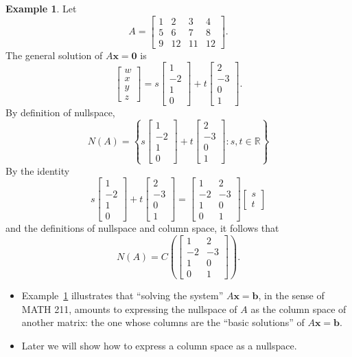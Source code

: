 \documentclass[12pt]{amsart}
\newcommand{\RR}{\mathbb{R}}
\theoremstyle{definition} \newtheorem{definition}[theorem]{Definition}
\newtheorem{example}[theorem]{Example}
\newcommand{\bb}{\mathbf{b}}
\newcommand{\bx}{\mathbf{x}}
\newcommand{\bzero}{\mathbf{0}}
\newcommand{\mat}[1]{\begin{bmatrix}#1\end{bmatrix}}
\begin{document}
\begin{example}\label{eg:null_to_column}
  Let
  \[
    A = \mat{1&2&3&4\\5&6&7&8\\9&12&11&12}.
  \]
  The general solution of $A\bx=\bzero$ is
  \[
    \mat{w\\x\\y\\z} = s\mat{1\\-2\\1\\0} + t\mat{2\\-3\\0\\1}.
  \]
  By definition of nullspace,
  \[
    N(A) = \left\{s\mat{1\\-2\\1\\0} + t\mat{2\\-3\\0\\1} : s,t\in\RR\right\}
  \]
  By the identity
  \[
    s\mat{1\\-2\\1\\0} + t\mat{2\\-3\\0\\1} =
    \mat{1&2\\-2&-3\\1&0\\0&1}\mat{s\\t}
  \]
  and the definitions of nullspace and column space, it follows that
  \[
    N(A) = C\left(\mat{1&2\\-2&-3\\1&0\\0&1}\right).
  \]
\end{example}

\begin{remarks}\hfill
  \begin{itemize}
    \item Example~\ref{eg:null_to_column} illustrates that ``solving the system'' $A\bx=\bb$, in the sense of MATH 211, amounts to expressing the nullspace of $A$ as the column space of another matrix: the one whose columns are the ``basic solutions'' of $A\bx=\bb$.
    \item Later we will show how to express a column space as a nullspace.
  \end{itemize}
\end{remarks}
\end{document}
